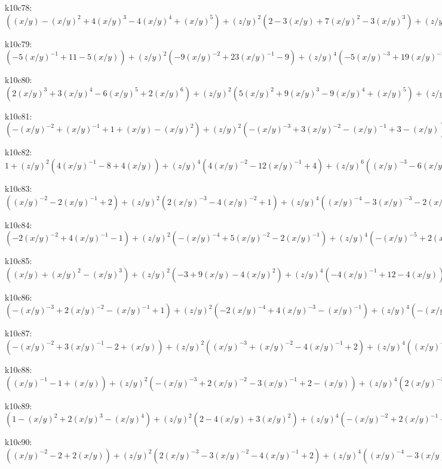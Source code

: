 k10c78: $ ((x/y)-(x/y)^{2}+4(x/y)^{3}-4(x/y)^{4}+(x/y)^{5})  +(z/y)^{2}(2-3(x/y)+7(x/y)^{2}-3(x/y)^{3})  +(z/y)^{4}((x/y)^{-1}-3+3(x/y))  -(x/y)^{-1}(z/y)^{6} $ 

k10c79: $ (-5(x/y)^{-1}+11-5(x/y))  +(z/y)^{2}(-9(x/y)^{-2}+23(x/y)^{-1}-9)  +(z/y)^{4}(-5(x/y)^{-3}+19(x/y)^{-2}-5(x/y)^{-1})  +(z/y)^{6}(-(x/y)^{-4}+7(x/y)^{-3}-(x/y)^{-2})  +(x/y)^{-4}(z/y)^{8} $ 

k10c80: $ (2(x/y)^{3}+3(x/y)^{4}-6(x/y)^{5}+2(x/y)^{6})  +(z/y)^{2}(5(x/y)^{2}+9(x/y)^{3}-9(x/y)^{4}+(x/y)^{5})  +(z/y)^{4}(4(x/y)+8(x/y)^{2}-3(x/y)^{3})  +(z/y)^{6}(1+2(x/y)) $ 

k10c81: $ (-(x/y)^{-2}+(x/y)^{-1}+1+(x/y)-(x/y)^{2})  +(z/y)^{2}(-(x/y)^{-3}+3(x/y)^{-2}-(x/y)^{-1}+3-(x/y))  +(z/y)^{4}(2(x/y)^{-3}-2(x/y)^{-2}+2(x/y)^{-1})  -(x/y)^{-3}(z/y)^{6} $ 

k10c82: $ 1  +(z/y)^{2}(4(x/y)^{-1}-8+4(x/y))  +(z/y)^{4}(4(x/y)^{-2}-12(x/y)^{-1}+4)  +(z/y)^{6}((x/y)^{-3}-6(x/y)^{-2}+(x/y)^{-1})  -(x/y)^{-3}(z/y)^{8} $ 

k10c83: $ ((x/y)^{-2}-2(x/y)^{-1}+2)  +(z/y)^{2}(2(x/y)^{-3}-4(x/y)^{-2}+1)  +(z/y)^{4}((x/y)^{-4}-3(x/y)^{-3}-2(x/y)^{-2}+(x/y)^{-1})  +(z/y)^{6}(-(x/y)^{-4}-(x/y)^{-3}) $ 

k10c84: $ (-2(x/y)^{-2}+4(x/y)^{-1}-1)  +(z/y)^{2}(-(x/y)^{-4}+5(x/y)^{-2}-2(x/y)^{-1})  +(z/y)^{4}(-(x/y)^{-5}+2(x/y)^{-4}+3(x/y)^{-3}-(x/y)^{-2})  +(z/y)^{6}((x/y)^{-5}+(x/y)^{-4}) $ 

k10c85: $ ((x/y)+(x/y)^{2}-(x/y)^{3})  +(z/y)^{2}(-3+9(x/y)-4(x/y)^{2})  +(z/y)^{4}(-4(x/y)^{-1}+12-4(x/y))  +(z/y)^{6}(-(x/y)^{-2}+6(x/y)^{-1}-1)  +(x/y)^{-2}(z/y)^{8} $ 

k10c86: $ (-(x/y)^{-3}+2(x/y)^{-2}-(x/y)^{-1}+1)  +(z/y)^{2}(-2(x/y)^{-4}+4(x/y)^{-3}-(x/y)^{-1})  +(z/y)^{4}(-(x/y)^{-5}+3(x/y)^{-4}+2(x/y)^{-3}-(x/y)^{-2})  +(z/y)^{6}((x/y)^{-5}+(x/y)^{-4}) $ 

k10c87: $ (-(x/y)^{-2}+3(x/y)^{-1}-2+(x/y))  +(z/y)^{2}((x/y)^{-3}+(x/y)^{-2}-4(x/y)^{-1}+2)  +(z/y)^{4}((x/y)^{-4}-2(x/y)^{-3}-3(x/y)^{-2}+(x/y)^{-1})  +(z/y)^{6}(-(x/y)^{-4}-(x/y)^{-3}) $ 

k10c88: $ ((x/y)^{-1}-1+(x/y))  +(z/y)^{2}(-(x/y)^{-3}+2(x/y)^{-2}-3(x/y)^{-1}+2-(x/y))  +(z/y)^{4}(2(x/y)^{-3}-2(x/y)^{-2}+2(x/y)^{-1})  -(x/y)^{-3}(z/y)^{6} $ 

k10c89: $ (1-(x/y)^{2}+2(x/y)^{3}-(x/y)^{4})  +(z/y)^{2}(2-4(x/y)+3(x/y)^{2})  +(z/y)^{4}(-(x/y)^{-2}+2(x/y)^{-1}-3)  +(x/y)^{-2}(z/y)^{6} $ 

k10c90: $ ((x/y)^{-2}-2+2(x/y))  +(z/y)^{2}(2(x/y)^{-3}-3(x/y)^{-2}-4(x/y)^{-1}+2)  +(z/y)^{4}((x/y)^{-4}-3(x/y)^{-3}-3(x/y)^{-2}+(x/y)^{-1})  +(z/y)^{6}(-(x/y)^{-4}-(x/y)^{-3}) $ 

